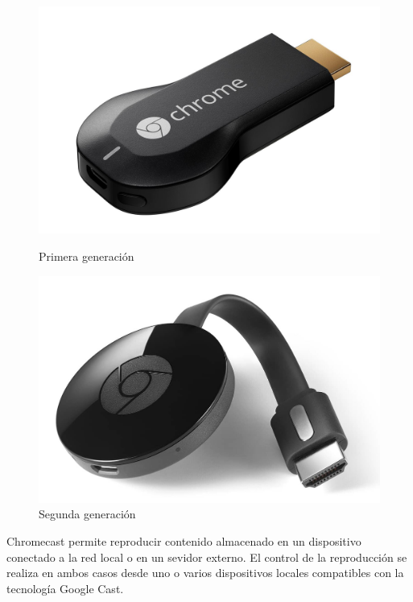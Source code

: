 \begin{figure}[h]
	\centering
	\begin{minipage}[b]{.35\textwidth}
		\includegraphics[scale=0.11]{./Imagenes/chromecast1gen.jpg}
		\caption{Primera generación}\label{fig:1gen}
	\end{minipage}\qquad
	\hspace{1cm}
	\begin{minipage}[b]{.35\textwidth}
		\includegraphics[scale=0.15]{./Imagenes/Chromecast.jpg}
		\caption{Segunda generación}\label{fig:2gen}
	\end{minipage}
\end{figure}

Chromecast permite reproducir contenido almacenado en un dispositivo conectado a la red local o en un sevidor externo. El control de la reproducción se realiza en ambos casos desde uno o varios dispositivos locales compatibles con la tecnología Google Cast.

